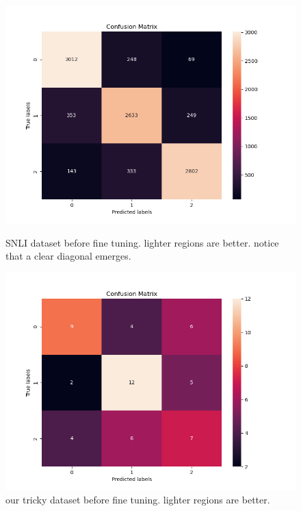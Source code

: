 \documentclass{article}
\begin{document}
\begin{figure}[!h]
	\centering
	\begin{minipage}{0.45\textwidth}
		\includegraphics[width=\linewidth]{figures/snli_trained_confusion.png}
		\caption{SNLI dataset before fine tuning. lighter regions are better. notice that a clear diagonal emerges.}
	\end{minipage}
	\hfill
	\begin{minipage}{0.45\textwidth}
		\includegraphics[width=\linewidth]{figures/tricky_trained_confusion.png}
		\caption{our tricky dataset before fine tuning. lighter regions are better.}
	\end{minipage}
\end{figure}
\end{document}
